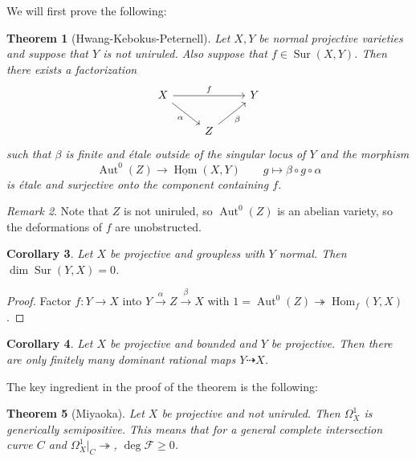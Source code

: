 \documentclass[leqno, openany]{memoir}
\newtheorem{thm}{Theorem}[section]
\newtheorem{cor}[thm]{Corollary}
\theoremstyle{definition}
\theoremstyle{remark}
\newtheorem{rmk}[thm]{Remark}
\theoremstyle{plain}
\theoremstyle{definition}
\theoremstyle{remark}
\newcommand{\mc}[1]{\mathcal{#1}}
\newcommand{\on}[1]{\operatorname{#1}}
\newcommand{\ul}[1]{\underline{#1}}
\DeclareMathOperator{\Hom}{Hom}
\DeclareMathOperator{\Aut}{Aut}
\begin{document}
We will first prove the following:

\begin{thm}[Hwang-Kebokus-Peternell]
    Let $X, Y$ be normal projective varieties and suppose that $Y$ is not uniruled. Also suppose that $f \in \on{Sur}(X, Y)$. Then there exists a factorization
    \begin{equation*}
    \begin{tikzcd}
        X \ar{rr}{f} \ar[swap]{dr}{\alpha} && Y \\
        & Z \ar[swap]{ur}{\beta}
    \end{tikzcd}
    \end{equation*}
    such that $\beta$ is finite and \'etale outside of the singular locus of $Y$ and the morphism
    \[ \Aut^0(Z) \to \ul{\Hom}(X, Y) \qquad g \mapsto \beta \circ g \circ \alpha \]
    is \'etale and surjective onto the component containing $f$.
\end{thm}

\begin{rmk}
    Note that $Z$ is not uniruled, so $\Aut^0(Z)$ is an abelian variety, so the deformations of $f$ are unobstructed.
\end{rmk}

\begin{cor}
    Let $X$ be projective and groupless with $Y$ normal. Then $\dim \on{Sur}(Y, X) = 0$.
\end{cor}

\begin{proof}
    Factor $f \colon Y \to X$ into $Y \xrightarrow{\alpha} Z \xrightarrow{\beta} X$ with $\qty{1} = \Aut^0(Z) \twoheadrightarrow \Hom_f(Y, X)$.
\end{proof}

\begin{cor}
    Let $X$ be projective and bounded and $Y$ be projective. Then there are only finitely many dominant rational maps $Y \dashrightarrow X$.
\end{cor}

The key ingredient in the proof of the theorem is the following:
\begin{thm}[Miyaoka]
    Let $X$ be projective and not uniruled. Then $\Omega_X^1$ is generically semipositive. This means that for a general complete intersection curve $C$ and $\Omega^1_X |_C \twoheadrightarrow$, $\deg \mc{F} \geq 0$.
\end{thm}
\end{document}
